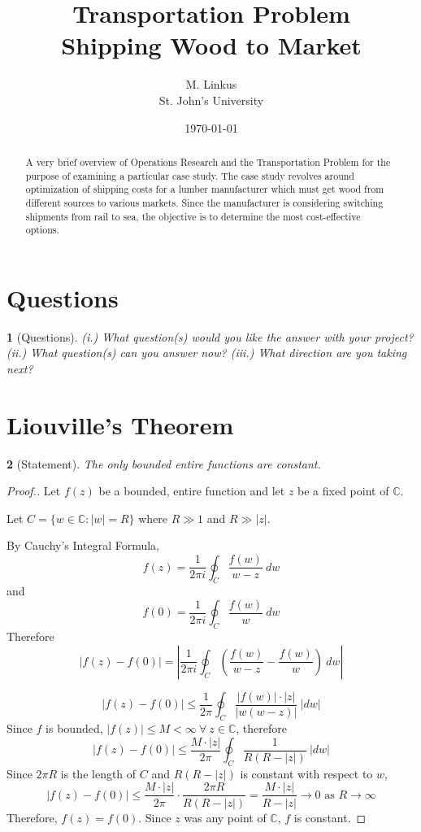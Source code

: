 \documentclass[12pt,letterpaper]{article}
\author{M. Linkus\\
St. John's University}
\title{Transportation Problem
\\Shipping Wood to Market}
\date{\today}
\theoremstyle{named}
\newtheorem*{theorem}{}
\begin{document}
\maketitle
\begin{abstract}
	A very brief overview of Operations Research and the Transportation Problem for the purpose of
	examining a particular case study.  The case study revolves around optimization of shipping costs
	for	a lumber manufacturer which must get wood from different sources to various markets.  Since
	the manufacturer is considering switching shipments from rail to sea, the objective is to determine
	the most cost-effective options.
\end{abstract}
\tableofcontents
\pagebreak

\section{Questions}
\begin{theorem}[Questions]
	(i.) What question(s) would you like the answer with your project?
	(ii.) What question(s) can you answer now?
	(iii.) What direction are you taking next?
\end{theorem}

%

\section{Liouville's Theorem}
\begin{theorem}[Statement]
	The only bounded entire functions are constant.
\end{theorem}
\begin{proof}[Proof.]
Let $f(z)$ be a bounded, entire function and let $z$ be a fixed point of $\mathbb{C}$.

Let $C = \{w \in \mathbb{C}: |w| = R \}$ where $R \gg 1$ and $R \gg |z|$.

By Cauchy's Integral Formula,
$$f(z) = \frac{1}{2\pi i} \oint_C \frac{f(w)}{w-z} ~dw $$
and
$$f(0) = \frac{1}{2\pi i} \oint_C \frac{f(w)}{w} ~dw $$
Therefore
$$|f(z) - f(0)| = \left|\frac{1}{2\pi i} \oint_C \left(\frac{f(w)}{w-z} - \frac{f(w)}{w}\right) ~dw \right|$$

$$|f(z) - f(0)| \leq \frac{1}{2\pi} \oint_C \frac{|f(w)| \cdot |z|}{|w (w-z)|} ~|dw| $$
Since $f$ is bounded, $|f(z)| \leq M < \infty ~\forall ~z \in \mathbb{C}$, therefore
$$|f(z) - f(0)| \leq \frac{M \cdot |z|}{2\pi} \oint_C \frac{1}{R (R-|z|)} ~|dw| $$
Since $2\pi R$ is the length of $C$ and $R (R-|z|)$ is constant with respect to $w$,
$$|f(z) - f(0)| \leq \frac{M \cdot |z|}{2\pi} \cdot \frac{2\pi R}{R (R-|z|)} = \frac{M \cdot |z|}{R-|z|} \to 0 \text{ as } R \to \infty$$
Therefore, $f(z) = f(0)$.  Since $z$ was any point of $\mathbb{C}$, $f$ is constant.
\end{proof}
\end{document}

